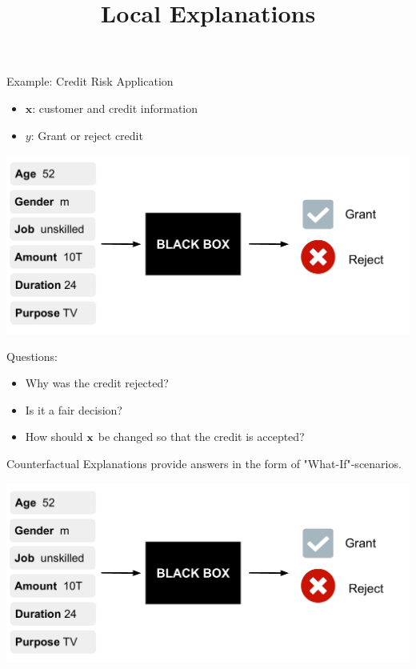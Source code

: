 \documentclass[11pt,compress,t,notes=noshow, xcolor=table]{beamer}
\title{Local Explanations}
\institute{\href{https://compstat-lmu.github.io/lecture_i2ml/}{compstat-lmu.github.io/lecture\_i2ml}}
\date{}
\begin{document}
	









\begin{vbframe}{Example: Credit Risk Application} 
	\begin{itemize}
		\item $\textbf{x}$: customer and credit information
		\item $y$: Grant or reject credit
	\end{itemize}
	\begin{center}\includegraphics[width=0.65\linewidth, page=1]{figure/counterfactuals_credit.pdf} \end{center}
	
	Questions: 
	\begin{itemize}
		\item Why was the credit rejected? 
		\item Is it a fair decision? 
		\item How should $\xv$ be changed so that the credit is accepted?  
	\end{itemize}
	
	\framebreak
	Counterfactual Explanations provide answers in the form of "What-If"-scenarios. 
	\begin{center}\includegraphics[width=0.65\linewidth, page=2]{figure/counterfactuals_credit.pdf} \end{center}
	

\end{vbframe}
\end{document}
